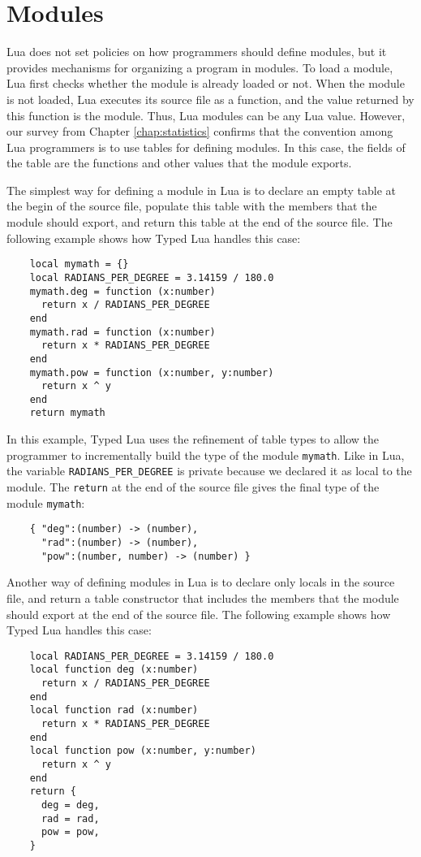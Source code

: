 \section{Modules}

Lua does not set policies on how programmers should define modules,
but it provides mechanisms for organizing a program in modules.
To load a module, Lua first checks whether the module is already
loaded or not.
When the module is not loaded, Lua executes its source file as a
function, and the value returned by this function is the module.
Thus, Lua modules can be any Lua value.
However, our survey from Chapter \ref{chap:statistics} confirms that
the convention among Lua programmers is to use tables for defining modules. 
In this case, the fields of the table are the functions and other
values that the module exports.

The simplest way for defining a module in Lua is to declare an
empty table at the begin of the source file,
populate this table with the members that the module should export,
and return this table at the end of the source file. 
The following example shows how Typed Lua handles this case:
\begin{verbatim}
    local mymath = {}
    local RADIANS_PER_DEGREE = 3.14159 / 180.0
    mymath.deg = function (x:number)
      return x / RADIANS_PER_DEGREE
    end
    mymath.rad = function (x:number)
      return x * RADIANS_PER_DEGREE
    end
    mymath.pow = function (x:number, y:number)
      return x ^ y
    end
    return mymath
\end{verbatim}

In this example, Typed Lua uses the refinement of table types to
allow the programmer to incrementally build the type of the
module \texttt{mymath}.
Like in Lua, the variable \texttt{RADIANS\string_PER\string_DEGREE}
is private because we declared it as local to the module. 
The \texttt{return} at the end of the source file gives the
final type of the module \texttt{mymath}:
\begin{verbatim}
    { "deg":(number) -> (number),
      "rad":(number) -> (number),
      "pow":(number, number) -> (number) }
\end{verbatim}

Another way of defining modules in Lua is to declare only locals
in the source file, and return a table constructor that includes
the members that the module should export at the end of the source file.
The following example shows how Typed Lua handles this case:
\begin{verbatim}
    local RADIANS_PER_DEGREE = 3.14159 / 180.0
    local function deg (x:number)
      return x / RADIANS_PER_DEGREE
    end
    local function rad (x:number)
      return x * RADIANS_PER_DEGREE
    end
    local function pow (x:number, y:number)
      return x ^ y
    end
    return {
      deg = deg,
      rad = rad,
      pow = pow,
    }
\end{verbatim}

